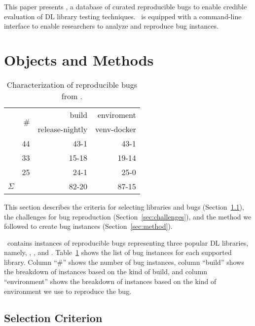 \documentclass[sigconf,screen]{acmart}
\begin{document}
This paper presents \tname, a database of curated reproducible bugs to
enable credible evaluation of DL library testing techniques. \tname\ is
equipped with a command-line interface to enable researchers to analyze
and reproduce bug instances.


\section{Objects and Methods}

\begin{table}
  \centering
  \caption{\label{table:bug-characterization}Characterization of reproducible bugs from \tname.}
\begin{tabular}{l|rrr}
  \toprule & \multirow{2}{*}{\#} & \multicolumn{1}{r}{build} &
  \multicolumn{1}{r}{enviroment} \\ & & release-nightly & venv-docker
  \\ \cmidrule(lr){2-4} \jax{} & 44 & 43-1 & 43-1 \\ \torch{} & 33 &
  15-18 & 19-14 \\ \tf{} & 25 & 24-1 & 25-0 \\ \midrule
  \multicolumn{1}{c|}{$\Sigma$} & \numbugs{} & 82-20 & 87-15
  \\ \bottomrule
\end{tabular}
\end{table}

This section describes the criteria for selecting libraries and bugs
(Section~\ref{sec:selection-criterion}), the challenges for bug
reproduction (Section~\ref{sec:challenges}), and the method we
followed to create bug instances (Section~\ref{sec:method}).

\tname\ contains \numbugs{} instances of reproducible bugs
representing three popular DL libraries, namely, \jax, \tf, and
\torch. Table~\ref{table:bug-characterization} shows the list of bug
instances for each supported library. Column ``\#'' shows the number
of bug instances, column ``build'' shows the breakdown of instances
based on the kind of build, and column ``environment'' shows the
breakdown of instances based on the kind of environment we use to
reproduce the bug.

\subsection{Selection Criterion}
\label{sec:selection-criterion}

\end{document}
